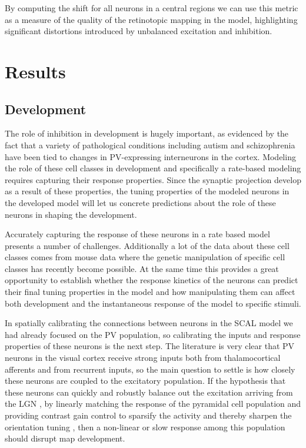 By computing the shift for all neurons in a central regions we can use
this metric as a measure of the quality of the retinotopic mapping in
the model, highlighting significant distortions introduced by
unbalanced excitation and inhibition.

\section{Results}

\subsection{Development}

The role of inhibition in development is hugely important, as
evidenced by the fact that a variety of pathological conditions
including autism \citep{Wohr2015} and schizophrenia \citep{Lewis2012}
have been tied to changes in PV-expressing interneurons in the
cortex. Modeling the role of these cell classes in development and
specifically a rate-based modeling requires capturing their response
properties. Since the synaptic projection develop as a result of these
properties, the tuning properties of the modeled neurons in the
developed model will let us concrete predictions about the role of
these neurons in shaping the development.

Accurately capturing the response of these neurons in a rate based
model presents a number of challenges. Additionally a lot of the data
about these cell classes comes from mouse data where the genetic
manipulation of specific cell classes has recently become possible. At
the same time this provides a great opportunity to establish whether
the response kinetics of the neurons can predict their final tuning
properties in the model and how manipulating them can affect both
development and the instantaneous response of the model to specific
stimuli.

In spatially calibrating the connections between neurons in the SCAL
model we had already focused on the PV population, so calibrating the
inputs and response properties of these neurons is the next step. The
literature is very clear that PV neurons in the visual cortex receive
strong inputs both from thalamocortical afferents and from recurrent
inputs, so the main question to settle is how closely these neurons
are coupled to the excitatory population. If the hypothesis that these
neurons can quickly and robustly balance out the excitation arriving
from the LGN \citep{Swadlow2003, Burkhalter2008}, by linearly matching
the response of the pyramidal cell population and providing contrast
gain control to sparsify the activity and thereby sharpen the
orientation tuning \citep{Wilson2012}, then a non-linear or slow
response among this population should disrupt map development.

